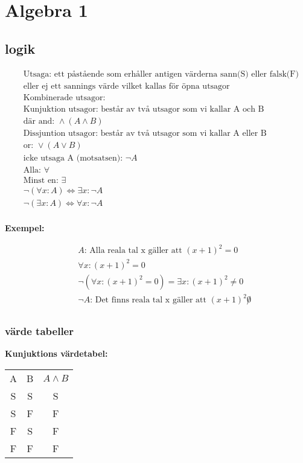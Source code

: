 \chapter{Algebra 1}

\newpage

\section{logik}
\begin{align*}
  &\quad \text{Utsaga: ett påstående som erhåller antigen värderna sann(S) eller falsk(F) vilket ge en stluten utsaga} \\
  &\quad \text{eller ej ett sannings värde vilket kallas för öpna utsagor} \\
  &\quad \text{Kombinerade utsagor:} \\
  &\quad \text{Kunjuktion utsagor: består av två utsagor som vi kallar A och B} \\
  &\quad \text{där and: } \land  (A \land B) \\
  &\quad \text{Dissjuntion utsagor: består av två utsagor som vi kallar A eller B} \\
  &\quad \text{or: } \lor  (A \lor B) \\
  &\quad \text{icke utsaga A (motsatsen): } \neg A \\
  &\quad \text{Alla: } \forall \\
  &\quad \text{Minst en: } \exists \\
  &\quad \neg(\forall x : A) \Leftrightarrow \exists x : \neg A \\
  &\quad \neg(\exists x : A) \Leftrightarrow \forall x : \neg A \\
\end{align*}

\textbf{Exempel:}\par
\begin{align*}
  &\quad A \text{: Alla reala tal x gäller att } (x+1)^2 = 0 \\
  &\quad \forall x : (x+1)^2 = 0 \\
  &\quad \neg(\forall x : (x+1)^2 = 0) = \exists x : (x+1)^2 \not = 0 \\
  &\quad \neg A \text{: Det finns reala tal x gäller att } (x+1)^2 \not 0 \\
\end{align*}



\subsection{värde tabeller}
\textbf{Kunjuktions värdetabel:}\par
\begin{center}
\begin{tabular}{ |c|c|c| } 
 \hline
 A  & B  & \(A \land B\) \\ 
 S  & S  & S          \\ 
 S  & F  & F          \\  
 F  & S  & F          \\ 
 F  & F  & F          \\ 
 \hline
\end{tabular}
\end{center}

